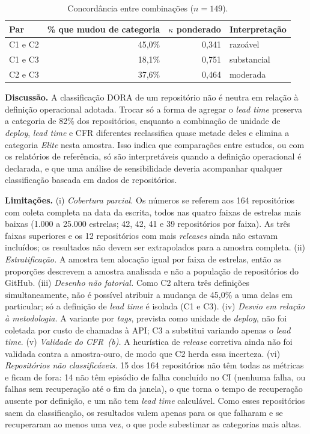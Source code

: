 \begin{table}[ht]
\centering
\caption{Concord\^ancia entre combina\c{c}\~oes ($n = 149$).}
\label{tab:rq07-pares}
\small
\begin{tabular}{lrrl}
\hline
Par & \% que mudou de categoria & $\kappa$ ponderado & Interpreta\c{c}\~ao \\
\hline
C1 e C2 & 45,0\% & 0,341 & razo\'avel \\
C1 e C3 & 18,1\% & 0,751 & substancial \\
C2 e C3 & 37,6\% & 0,464 & moderada \\
\hline
\end{tabular}
\end{table}

\textbf{Discuss\~ao.} A classifica\c{c}\~ao DORA de um reposit\'orio n\~ao \'e neutra em rela\c{c}\~ao
\`a defini\c{c}\~ao operacional adotada. Trocar s\'o a forma de agregar o \textit{lead time}
preserva a categoria de 82\% dos reposit\'orios, enquanto a combina\c{c}\~ao de unidade de
\textit{deploy}, \textit{lead time} e CFR diferentes reclassifica quase metade deles e elimina a
categoria \textit{Elite} nesta amostra. Isso indica que compara\c{c}\~oes entre estudos, ou com os
relat\'orios de refer\^encia, s\'o s\~ao interpret\'aveis quando a defini\c{c}\~ao operacional \'e
declarada, e que uma an\'alise de sensibilidade deveria acompanhar qualquer classifica\c{c}\~ao
baseada em dados de reposit\'orios.

\textbf{Limita\c{c}\~oes.} (i) \textit{Cobertura parcial.} Os n\'umeros se referem aos 164
reposit\'orios com coleta completa na data da escrita, todos nas quatro faixas de estrelas mais
baixas (1.000 a 25.000 estrelas; 42, 42, 41 e 39 reposit\'orios por faixa). As tr\^es faixas
superiores e os 12 reposit\'orios com mais \textit{releases} ainda n\~ao estavam inclu\'idos; os
resultados n\~ao devem ser extrapolados para a amostra completa. (ii) \textit{Estratifica\c{c}\~ao.}
A amostra tem aloca\c{c}\~ao igual por faixa de estrelas, ent\~ao as propor\c{c}\~oes descrevem a
amostra analisada e n\~ao a popula\c{c}\~ao de reposit\'orios do GitHub. (iii) \textit{Desenho n\~ao
fatorial.} Como C2 altera tr\^es defini\c{c}\~oes simultaneamente, n\~ao \'e poss\'ivel atribuir a
mudan\c{c}a de 45,0\% a uma delas em particular; s\'o a defini\c{c}\~ao de \textit{lead time} \'e
isolada (C1 e C3). (iv) \textit{Desvio em rela\c{c}\~ao \`a metodologia.} A variante por
\textit{tags}, prevista como unidade de \textit{deploy}, n\~ao foi coletada por custo de chamadas
\`a API; C3 a substitui variando apenas o \textit{lead time}. (v) \textit{Validade do CFR~(b).} A
heur\'istica de \textit{release} corretiva ainda n\~ao foi validada contra a amostra-ouro, de modo
que C2 herda essa incerteza. (vi) \textit{Reposit\'orios n\~ao classific\'aveis.} 15 dos 164
reposit\'orios n\~ao t\^em todas as m\'etricas e ficam de fora: 14 n\~ao t\^em epis\'odio de falha
conclu\'ido no CI (nenhuma falha, ou falhas sem recupera\c{c}\~ao at\'e o fim da janela), o que torna o
tempo de recupera\c{c}\~ao ausente por defini\c{c}\~ao, e um n\~ao tem \textit{lead time} calcul\'avel. Como esses
reposit\'orios saem da classifica\c{c}\~ao, os resultados valem apenas para os que falharam e se
recuperaram ao menos uma vez, o que pode subestimar as categorias mais altas.
